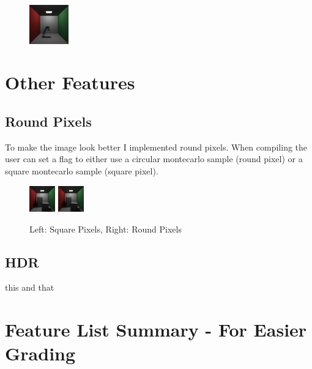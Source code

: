\documentclass{article}
\begin{document}
        \begin{figure}[h!]
            \centering
            \includegraphics[width=0.15\textwidth]{samples/MotionBlur.png}
        \end{figure}



\section{Other Features}

    \subsection{Round Pixels}
    To make the image look better I implemented round pixels. When compiling the user can set a flag to either use a circular montecarlo sample (round pixel) or a square montecarlo sample (square pixel). \par

    \begin{figure}[h!]
        \centering
        \includegraphics[width=0.1\textwidth]{samples/SquarePixels.png}
        \includegraphics[width=0.1\textwidth]{samples/CornellRoundPixels.png}
        \caption{Left: Square Pixels, Right: Round Pixels}
    \end{figure}

    \subsection{HDR}
    this and that \par

\section{Feature List Summary - For Easier Grading}
\end{document}
